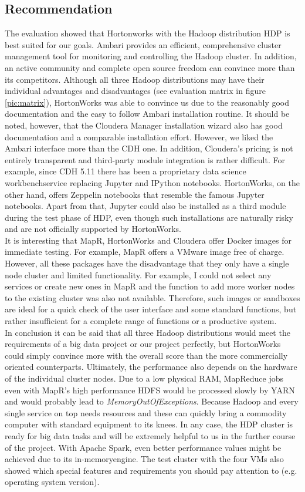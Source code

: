 \documentclass[12pt]{article}
\begin{document}
\subsection{Recommendation}
The evaluation showed that Hortonworks with the Hadoop distribution HDP is best suited for our goals.
Ambari provides an efficient, comprehensive cluster management tool for monitoring and controlling the
Hadoop cluster. In addition, an active community and complete open source freedom can convince more
than its competitors. Although all three Hadoop distributions may have their individual advantages and
disadvantages (see evaluation matrix in figure \ref{pic:matrix}), HortonWorks was able to convince us due to the reasonably good documentation and the easy to follow Ambari installation routine. It should be noted, however, that the Cloudera Manager installation wizard also has good documentation and a comparable installation effort. However, we liked the Ambari interface more than the CDH one. In addition, Cloudera's pricing is not entirely transparent and third-party module integration is rather difficult. For example, since CDH 5.11 there has been a proprietary \glqq data science workbench\grqq service replacing Jupyter and IPython notebooks. HortonWorks, on the other hand, offers Zeppelin notebooks that resemble the famous Jupyter notebooks. Apart from that, Jupyter could also be installed as a third module during the test phase of HDP, even though such installations are naturally risky and are not officially supported by HortonWorks.
\\It is interesting that MapR, HortonWorks and Cloudera offer Docker images for immediate testing. For
example, MapR offers a VMware image free of charge. However, all these packages have the disadvantage
that they only have a single node cluster and limited functionality. For example, I could not select any
services or create new ones in MapR and the function to add more worker nodes to the existing cluster
was also not available. Therefore, such images or sandboxes are ideal for a quick check of the user interface and some standard functions, but rather insufficient for a complete range of functions or a productive system.\\
In conclusion it can be said that all three Hadoop distributions would meet the requirements of a big data
project or our project perfectly, but HortonWorks could simply convince more with the overall score than
the more commercially oriented counterparts. Ultimately, the performance also depends on the hardware
of the individual cluster nodes. Due to a low physical RAM, MapReduce jobs even with MapR's high
performance HDFS would be processed slowly by YARN and would probably lead to
\emph{MemoryOutOfExceptions}. Because Hadoop and every single service on top needs resources and these can
quickly bring a commodity computer with standard equipment to its knees. In any case, the HDP cluster is
ready for big data tasks and will be extremely helpful to us in the further course of the project. With Apache Spark, even better performance values might be achieved due to its \glqq in-memory\grqq engine. The test cluster with the four VMs also showed which special features and requirements you should pay attention to (e.g. operating system version).
\end{document}
